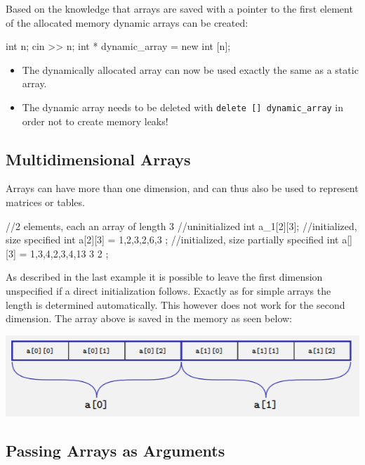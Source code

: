 \documentclass[10pt,a4paper]{scrartcl}
\begin{document}
\begin{multicols*}{2}
Based on the knowledge that arrays are saved with a pointer to the first element of the allocated memory dynamic arrays can be created:

\begin{TPCpp}
int n;
cin >> n;
int * dynamic_array = new int [n];
\end{TPCpp}

\begin{itemize}
\item The dynamically allocated array can now be used exactly the same as a static array.
\item The dynamic array needs to be deleted with \verb+delete [] dynamic_array+ in order not to create memory leaks!
\end{itemize}

\subsection{Multidimensional Arrays}
\label{sec:MultidimensionalArrays}

Arrays can have more than one dimension, and can thus also be used to represent matrices or tables. 

\begin{TPCpp}
//2 elements, each an array of length 3
//uninitialized
int a_1[2][3];
//initialized, size specified
int a[2][3] = {
	{1,2,3},{2,6,3}
};
//initialized, size partially specified
int a[][3] = {
	{1,3,4},{2,3,4},{13 3 2}
};
\end{TPCpp}

As described in the last example it is possible to leave the first dimension unspecified if a direct initialization follows. Exactly as for simple arrays the length is determined automatically. This however does not work for the second dimension.
The array above is saved in the memory as seen below:

\includegraphics[width=\linewidth]{Pictures/2DArray}

\subsection{Passing Arrays as Arguments}
\label{sec:PassingArraysAsArguments}


\end{multicols*}
\end{document}
